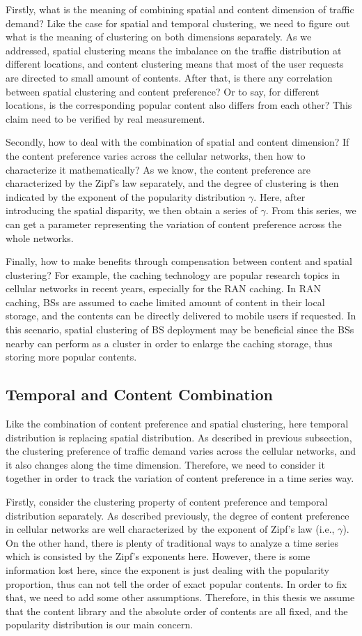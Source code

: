 Firstly, what is the meaning of combining spatial and content dimension of traffic demand? Like the case for spatial and temporal clustering, we need to figure out what is the meaning of clustering on both dimensions separately. As we addressed, spatial clustering means the imbalance on the traffic distribution at different locations, and content clustering means that most of the user requests are directed to small amount of contents. After that, is there any correlation between spatial clustering and content preference? Or to say, for different locations, is the corresponding popular content also differs from each other? This claim need to be verified by real measurement.

Secondly, how to deal with the combination of spatial and content dimension? If the content preference varies across the cellular networks, then how to characterize it mathematically? As we know, the content preference are characterized by the Zipf's law separately, and the degree of clustering is then indicated by the exponent of the popularity distribution $\gamma$. Here, after introducing the spatial disparity, we then obtain a series of $\gamma$. From this series, we can get a parameter representing the variation of content preference across the whole networks.

Finally, how to make benefits through compensation between content and spatial clustering? For example, the caching technology are popular research topics in cellular networks in recent years, especially for the RAN caching. In RAN caching, BSs are assumed to cache limited amount of content in their local storage, and the contents can be directly delivered to mobile users if requested. In this scenario, spatial clustering of BS deployment may be beneficial since the BSs nearby can perform as a cluster in order to enlarge the caching storage, thus storing more popular contents.
\subsection{Temporal and Content Combination}
Like the combination of content preference and spatial clustering, here temporal distribution is replacing spatial distribution. As described in previous subsection, the clustering preference of traffic demand varies across the cellular networks, and it also changes along the time dimension. Therefore, we need to consider it together in order to track the variation of content preference in a time series way.

Firstly, consider the clustering property of content preference and temporal distribution separately. As described previously, the degree of content preference in cellular networks are well characterized by the exponent of Zipf's law (i.e., $\gamma$). On the other hand, there is plenty of traditional ways to analyze a time series which is consisted by the Zipf's exponents here. However, there is some information lost here, since the exponent is just dealing with the popularity proportion, thus can not tell the order of exact popular contents. In order to fix that, we need to add some other assumptions. Therefore, in this thesis we assume that the content library and the absolute order of contents are all fixed, and the popularity distribution is our main concern.

